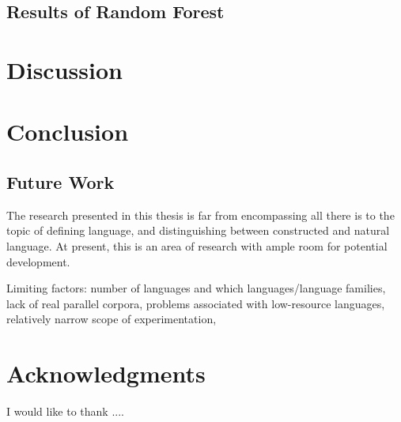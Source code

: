\documentclass[12pt,a4paper]{article}
\numberwithin{figure}{section}
\numberwithin{table}{section}
\numberwithin{definition}{section}
\begin{document}
\subsection{Results of Random Forest}
\label{ssec:randomforestresults}

\newpage
\section{Discussion}
\label{sec:discussion}


\newpage
\section{Conclusion}
\label{sec:conclusion}

\subsection{Future Work}
\label{ssec:futurework}

The research presented in this thesis is far from encompassing all there is to the topic of defining language, and distinguishing between constructed and natural language. At present, this is an area of research with ample room for potential development. 

Limiting factors: number of languages and which languages/language families, lack of real parallel corpora, problems associated with low-resource languages, relatively narrow scope of experimentation,

\newpage
\section{Acknowledgments}
\label{sec:acknowledgments}
I would like to thank ....
\end{document}
